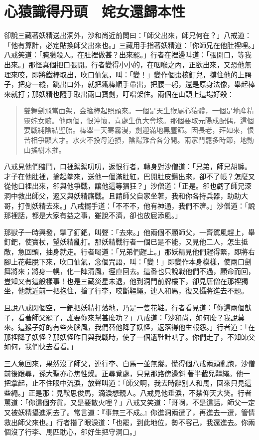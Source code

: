 
\chapter{心猿識得丹頭　姹女還歸本性}

卻說三藏著妖精送出洞外，沙和尚近前問曰：「師父出來，師兄何在？」八戒道：「他有算計，必定貼換師父出來也。」三藏用手指著妖精道：「你師兄在他肚裡哩。」八戒笑道：「腌臢殺人。在肚裡做甚？出來罷。」行者在裡邊叫道：「張開口，等我出來。」那怪真個把口張開。行者變得小小的，在咽喉之內，正欲出來，又恐他無理來咬，即將鐵棒取出，吹口仙氣，叫：「變！」變作個棗核釘兒，撐住他的上腭子，把身一縱，跳出口外，就把鐵棒順手帶出，把腰一躬，還是原身法像，舉起棒來就打；那妖精也隨手取出兩口寶劍，叮噹架住。兩個在山頭上這場好殺：
\begin{quote}
雙舞劍飛當面架，金箍棒起照頭來。一個是天生猴屬心猿體，一個是地產精靈姹女骸。他兩個，恨沖懷，喜處生仇大會垓。那個要取元陽成配偶，這個要戰純陰結聖胎。棒舉一天寒霧漫，劍迎滿地黑塵篩。因長老，拜如來，恨苦相爭顯大才。水火不投母道損，陰陽難合各分開。兩家鬥罷多時節，地動山搖樹木摧。
\end{quote}

八戒見他們賭鬥，口裡絮絮叨叨，返恨行者，轉身對沙僧道：「兄弟，師兄胡纏。才子在他肚裡，掄起拳來，送他一個滿肚紅，巴開肚皮鑽出來，卻不了帳？怎麼又從他口裡出來，卻與他爭戰，讓他這等猖狂？」沙僧道：「正是。卻也虧了師兄深洞中救出師父，返又與妖精廝戰。且請師父自家坐著，我和你各持兵器，助助大哥，打倒妖精去來。」八戒擺手道：「不不不，他有神通，我們不濟。」沙僧道：「說那裡話，都是大家有益之事，雖說不濟，卻也放屁添風。」

那獃子一時興發，掣了釘鈀，叫聲：「去來。」他兩個不顧師父，一齊駕風趕上，舉釘鈀，使寶杖，望妖精亂打。那妖精戰行者一個已是不能，又見他二人，怎生抵敵，急回頭，抽身就走。行者喝道：「兄弟們趕上。」那妖精見他們趕得緊，即將右腳上花鞋脫下來，吹口仙氣，念個咒語，叫：「變！」即變作本身模樣，使兩口劍舞將來；將身一幌，化一陣清風，徑直回去。這番也只說戰他們不過，顧命而回，豈知又有這般樣事！也是三藏災星未退，他到洞門前牌樓下，卻見唐僧在那裡獨坐，他就近前一把抱住，搶了行李，咬斷韁繩，連人和馬，復又攝將進去不題。

且說八戒閃個空，一鈀把妖精打落地，乃是一隻花鞋。行者看見道：「你這兩個獃子，看著師父罷了，誰要你來幫甚麼功？」八戒道：「沙和尚，如何麼？我說莫來。這猴子好的有些夾腦風，我們替他降了妖怪，返落得他生報怨。」行者道：「在那裡降了妖怪？那妖怪昨日與我戰時，使了一個遺鞋計哄了。你們走了，不知師父如何，我們快去看看。」

三人急回來，果然沒了師父，連行李、白馬一並無蹤。慌得個八戒兩頭亂跑，沙僧前後跟尋，孫大聖亦心焦性燥。正尋覓處，只見那路傍邊斜𢷑著半截兒韁繩。他一把拿起，止不住眼中流淚，放聲叫道：「師父啊，我去時辭別人和馬，回來只見這些繩。」正是那：見鞍思俊馬，滴淚想親人。八戒見他垂淚，不禁仰天大笑。行者罵道：「你這個夯貨，又是要散火哩？」八戒又笑道：「哥啊，不是這話，師父一定又被妖精攝進洞去了。常言道：『事無三不成。』你進洞兩遭了，再進去一遭，管情救出師父來也。」行者揩了眼淚道：「也罷，到此地位，勢不容己，我還進去。你兩個沒了行李、馬匹耽心，卻好生把守洞口。」

